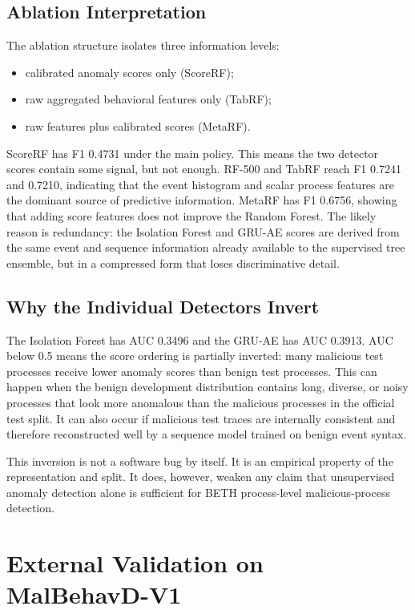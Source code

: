 \documentclass[journal]{IEEEtran}
\begin{document}
\subsection{Ablation Interpretation}

The ablation structure isolates three information levels:
\begin{itemize}
    \item calibrated anomaly scores only (ScoreRF);
    \item raw aggregated behavioral features only (TabRF);
    \item raw features plus calibrated scores (MetaRF).
\end{itemize}
ScoreRF has F1 0.4731 under the main policy. This means the two detector scores contain some signal, but not enough. RF-500 and TabRF reach F1 0.7241 and 0.7210, indicating that the event histogram and scalar process features are the dominant source of predictive information. MetaRF has F1 0.6756, showing that adding score features does not improve the Random Forest. The likely reason is redundancy: the Isolation Forest and GRU-AE scores are derived from the same event and sequence information already available to the supervised tree ensemble, but in a compressed form that loses discriminative detail.

\subsection{Why the Individual Detectors Invert}

The Isolation Forest has AUC 0.3496 and the GRU-AE has AUC 0.3913. AUC below 0.5 means the score ordering is partially inverted: many malicious test processes receive lower anomaly scores than benign test processes. This can happen when the benign development distribution contains long, diverse, or noisy processes that look more anomalous than the malicious processes in the official test split. It can also occur if malicious test traces are internally consistent and therefore reconstructed well by a sequence model trained on benign event syntax.

This inversion is not a software bug by itself. It is an empirical property of the representation and split. It does, however, weaken any claim that unsupervised anomaly detection alone is sufficient for BETH process-level malicious-process detection.

\section{External Validation on MalBehavD-V1}
\label{sec:external_malbehavd}
\end{document}
